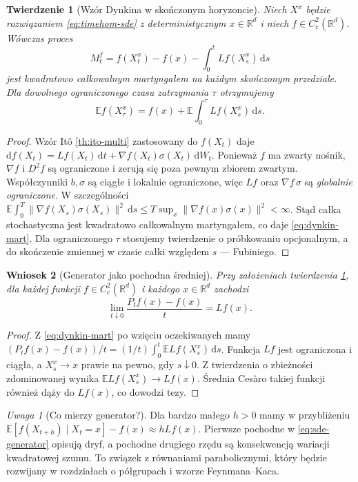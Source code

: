 \documentclass[11pt,a4paper,oneside]{report}
\numberwithin{equation}{chapter}
\theoremstyle{plain}
\newtheorem{twierdzenie}{Twierdzenie}[chapter]
\newtheorem{wniosek}[twierdzenie]{Wniosek}
\theoremstyle{definition}
\theoremstyle{remark}
\newtheorem{uwaga}{Uwaga}[chapter]
\newcommand{\R}{\mathbb{R}}
\newcommand{\E}{\mathbb{E}}
\newcommand{\dd}{\mathrm{d}}
\newcommand{\norm}[1]{\lVert #1\rVert}
\begin{document}
\begin{twierdzenie}[Wzór Dynkina w skończonym horyzoncie]
\label{th:sde-dynkin}
Niech $X^x$ będzie rozwiązaniem \eqref{eq:timehom-sde}
z deterministycznym $x\in\R^d$ i niech
$f\in C_c^2(\R^d)$. Wówczas proces
\[
M_t^f=f(X_t^x)-f(x)-\int_0^tLf(X_s^x)\,\dd s
\tag{6.6}\label{eq:dynkin-mart}
\]
jest kwadratowo całkowalnym martyngałem na każdym
skończonym przedziale. Dla dowolnego ograniczonego
czasu zatrzymania $\tau$ otrzymujemy
\[
\E f(X_\tau^x)=f(x)+\E\int_0^\tau Lf(X_s^x)\,\dd s.
\tag{6.7}\label{eq:dynkin-optional}
\]
\end{twierdzenie}
\begin{proof}
Wzór Itô \ref{th:ito-multi} zastosowany do $f(X_t)$
daje
$\dd f(X_t)=Lf(X_t)\,\dd t+
\nabla f(X_t)\sigma(X_t)\,\dd W_t$.
Ponieważ $f$ ma zwarty nośnik, $\nabla f$ i
$D^2 f$ są ograniczone i zerują się poza pewnym
zbiorem zwartym. Współczynniki $b,\sigma$ są
ciągłe i lokalnie ograniczone, więc $Lf$ oraz
$\nabla f\,\sigma$ są \emph{globalnie ograniczone}.
W szczególności
$\E\int_0^T\norm{\nabla f(X_s)\sigma(X_s)}^2\,\dd s
\le T\sup_x\norm{\nabla f(x)\sigma(x)}^2<\infty$.
Stąd całka stochastyczna jest kwadratowo całkowalnym
martyngałem, co daje \eqref{eq:dynkin-mart}.
Dla ograniczonego $\tau$ stosujemy twierdzenie
o próbkowaniu opcjonalnym, a do skończenie zmiennej
w czasie całki względem $s$ — Fubiniego.
\end{proof}

\begin{wniosek}[Generator jako pochodna średniej]
\label{cor:sde-gen-limit}
Przy założeniach twierdzenia \ref{th:sde-dynkin},
dla każdej funkcji $f\in C_c^2(\R^d)$ i każdego
$x\in\R^d$ zachodzi
\[
\lim_{t\downarrow0}\frac{P_tf(x)-f(x)}{t}=Lf(x).
\tag{6.8}\label{eq:genlimit}
\]
\end{wniosek}
\begin{proof}
Z \eqref{eq:dynkin-mart} po wzięciu oczekiwanych mamy
$(P_tf(x)-f(x))/t=(1/t)\int_0^t\E Lf(X_s^x)\,\dd s$.
Funkcja $Lf$ jest ograniczona i ciągła, a
$X_s^x\to x$ prawie na pewno, gdy $s\downarrow0$.
Z twierdzenia o zbieżności zdominowanej wynika
$\E Lf(X_s^x)\to Lf(x)$.
Średnia Cesàro takiej funkcji również dąży do
$Lf(x)$, co dowodzi tezy.
\end{proof}

\begin{uwaga}[Co mierzy generator?]
Dla bardzo małego $h>0$ mamy w przybliżeniu
$\E[f(X_{t+h})\mid X_t=x]-f(x)\approx hLf(x)$.
Pierwsze pochodne w \eqref{eq:sde-generator}
opisują dryf, a pochodne drugiego rzędu są
konsekwencją wariacji kwadratowej szumu.
To związek z równaniami parabolicznymi, który
będzie rozwijany w rozdziałach o półgrupach i
wzorze Feynmana--Kaca.
\end{uwaga}
\end{document}
